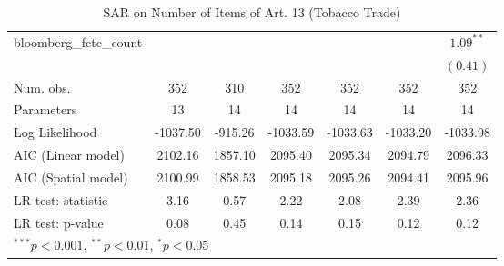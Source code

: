 \begin{table}[!h]
\begin{center}
\begin{tabular}{l c c c c c c }
bloomberg\_fctc\_count  &              &              &              &              &              & $1.09^{**}$  \\
                        &              &              &              &              &              & $(0.41)$     \\
\midrule
Num. obs.               & 352          & 310          & 352          & 352          & 352          & 352          \\
Parameters              & 13           & 14           & 14           & 14           & 14           & 14           \\
Log Likelihood          & -1037.50     & -915.26      & -1033.59     & -1033.63     & -1033.20     & -1033.98     \\
AIC (Linear model)      & 2102.16      & 1857.10      & 2095.40      & 2095.34      & 2094.79      & 2096.33      \\
AIC (Spatial model)     & 2100.99      & 1858.53      & 2095.18      & 2095.26      & 2094.41      & 2095.96      \\
LR test: statistic      & 3.16         & 0.57         & 2.22         & 2.08         & 2.39         & 2.36         \\
LR test: p-value        & 0.08         & 0.45         & 0.14         & 0.15         & 0.12         & 0.12         \\
\bottomrule
\multicolumn{7}{l}{\scriptsize{$^{***}p<0.001$, $^{**}p<0.01$, $^*p<0.05$}}
\end{tabular}
\caption{SAR on Number of Items of Art. 13 (Tobacco Trade)}
\label{table:coefficients}
\end{center}
\end{table}
